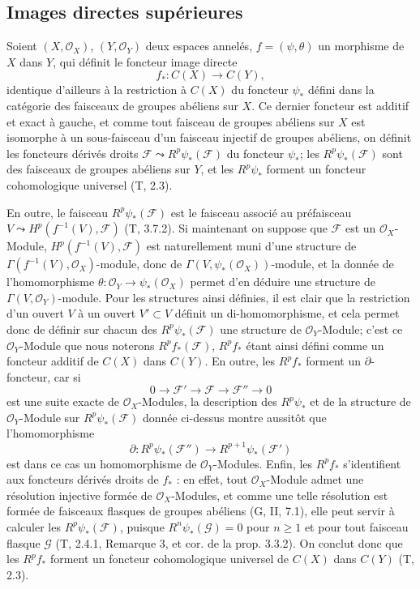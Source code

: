 \subsection{Images directes supérieures}
\label{subsection:0.12.2-fr}

\begin{env}[12.2.1]
\label{0.12.2.1-fr}
Soient $(X,\mathcal O_X)$, $(Y,\mathcal O_Y)$ deux espaces annelés,
$f=(\psi,\theta)$ un morphisme de $X$ dans $Y$, qui définit le foncteur
image directe
\[
f_*:C(X)\longrightarrow C(Y),
\]
identique d'ailleurs à la restriction à $C(X)$ du foncteur $\psi_*$ défini
dans la catégorie des faisceaux de groupes abéliens sur $X$. Ce dernier
foncteur est additif et exact à gauche, et comme tout faisceau de groupes
abéliens sur $X$ est isomorphe à un sous-faisceau d'un faisceau injectif de
groupes abéliens, on définit les foncteurs dérivés droits
$\mathcal F\leadsto R^p\psi_*(\mathcal F)$ du foncteur $\psi_*$; les
$R^p\psi_*(\mathcal F)$ sont des faisceaux de groupes abéliens sur $Y$, et
les $R^p\psi_*$ forment un foncteur cohomologique universel (T, 2.3).

En outre, le faisceau $R^p\psi_*(\mathcal F)$ est le faisceau associé au
préfaisceau $V\leadsto H^p(f^{-1}(V),\mathcal F)$ (T, 3.7.2). Si maintenant
on suppose que $\mathcal F$ est un $\mathcal O_X$-Module,
$H^p(f^{-1}(V),\mathcal F)$ est naturellement muni d'une structure de
$\Gamma(f^{-1}(V),\mathcal O_X)$-module, donc de
$\Gamma(V,\psi_*(\mathcal O_X))$-module, et la donnée de l'homomorphisme
$\theta:\mathcal O_Y\to\psi_*(\mathcal O_X)$ permet d'en déduire une
structure de $\Gamma(V,\mathcal O_Y)$-module. Pour les structures ainsi
définies, il est clair que la restriction d'un ouvert $V$ à un ouvert
$V'\subset V$ définit un di-homomorphisme, et cela permet donc de définir sur
chacun des $R^p\psi_*(\mathcal F)$ une structure de $\mathcal O_Y$-Module;
c'est ce $\mathcal O_Y$-Module que nous noterons $R^p f_*(\mathcal F)$,
$R^p f_*$ étant ainsi défini comme un foncteur additif de $C(X)$ dans
$C(Y)$. En outre, les $R^p f_*$ forment un $\partial$-foncteur, car si
\[
0\longrightarrow\mathcal F'\longrightarrow\mathcal F
\longrightarrow\mathcal F''\longrightarrow0
\]
est une suite exacte de $\mathcal O_X$-Modules, la description des
$R^p\psi_*$ et de la structure de $\mathcal O_Y$-Module sur
$R^p\psi_*(\mathcal F)$ donnée ci-dessus montre aussitôt que
l'homomorphisme
\[
\partial:R^p\psi_*(\mathcal F'')\longrightarrow
R^{p+1}\psi_*(\mathcal F')
\]
est dans ce cas un homomorphisme de $\mathcal O_Y$-Modules. Enfin, les
$R^p f_*$ s'identifient aux foncteurs dérivés droits de $f_*$ : en effet,
tout $\mathcal O_X$-Module admet une résolution injective formée de
$\mathcal O_X$-Modules, et comme une telle résolution est formée de faisceaux
flasques de groupes abéliens (G, II, 7.1), elle peut servir à calculer les
$R^p\psi_*(\mathcal F)$, puisque $R^n\psi_*(\mathcal G)=0$ pour $n\geq1$ et
pour tout faisceau flasque $\mathcal G$ (T, 2.4.1, Remarque 3, et cor. de la
prop. 3.3.2). On conclut donc que les $R^p f_*$ forment un foncteur
cohomologique universel de $C(X)$ dans $C(Y)$ (T, 2.3).
\end{env}


